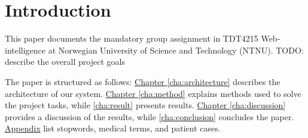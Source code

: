 \chapter{Introduction}
This paper documents the mandatory group assignment in TDT4215 Web-intelligence
at Norwegian University of Science and Technology (NTNU).
TODO: describe the overall project goals

The paper is structured as follows:
\hyperref[cha:architecture]{Chapter \ref*{cha:architecture}} describes the
architecture of our system.
\hyperref[cha:method]{Chapter \ref*{cha:method}} explains methods used to
solve the project tasks, while \autoref{cha:result} presents results.
\hyperref[cha:discussion]{Chapter \ref*{cha:discussion}} provides a discussion
of the results, while \autoref{cha:conclusion} concludes the paper.
\hyperref[appendix]{Appendix} list stopwords, medical terms,
and patient cases.
